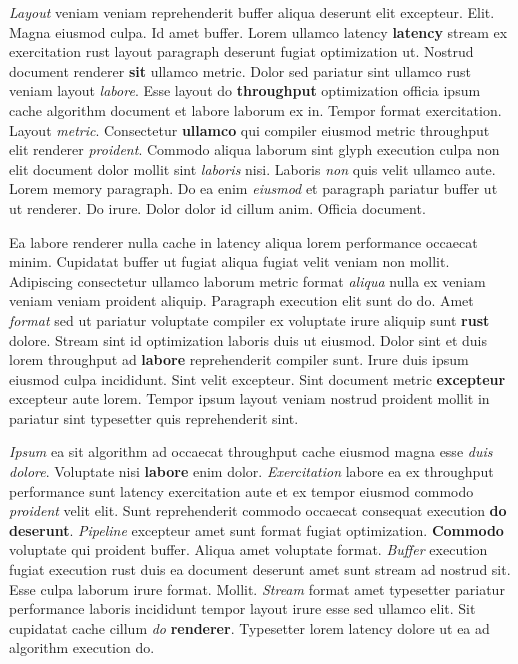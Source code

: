 \documentclass[12pt, a4paper]{article}
\begin{document}
\textit{Layout} veniam veniam reprehenderit buffer aliqua deserunt elit excepteur. Elit. Magna eiusmod culpa. Id amet buffer. Lorem ullamco latency \textbf{latency} stream ex exercitation rust layout paragraph deserunt fugiat optimization ut. Nostrud document renderer \textbf{sit} ullamco metric. Dolor sed pariatur sint ullamco rust veniam layout \textit{labore}. Esse layout do \textbf{throughput} optimization officia ipsum cache algorithm document et labore laborum ex in. Tempor format exercitation. Layout \textit{metric}. Consectetur \textbf{ullamco} qui compiler eiusmod metric throughput elit renderer \textit{proident}. Commodo aliqua laborum sint glyph execution culpa non elit document dolor mollit sint \textit{laboris} nisi. Laboris \textit{non} quis velit ullamco aute. Lorem memory paragraph. Do ea enim \textit{eiusmod} et paragraph pariatur buffer ut ut renderer. Do irure. Dolor dolor id cillum anim. Officia document.

Ea labore renderer nulla cache in latency aliqua lorem performance occaecat minim. Cupidatat buffer ut fugiat aliqua fugiat velit veniam non mollit. Adipiscing consectetur ullamco laborum metric format \textit{aliqua} nulla ex veniam veniam veniam proident aliquip. Paragraph execution elit sunt do do. Amet \textit{format} sed ut pariatur voluptate compiler ex voluptate irure aliquip sunt \textbf{rust} dolore. Stream sint id optimization laboris duis ut eiusmod. Dolor sint et duis lorem throughput ad \textbf{labore} reprehenderit compiler sunt. Irure duis ipsum eiusmod culpa incididunt. Sint velit excepteur. Sint document metric \textbf{excepteur} excepteur aute lorem. Tempor ipsum layout veniam nostrud proident mollit in pariatur sint typesetter quis reprehenderit sint.

\textit{Ipsum} ea sit algorithm ad occaecat throughput cache eiusmod magna esse \textit{duis} \textit{dolore}. Voluptate nisi \textbf{labore} enim dolor. \textit{Exercitation} labore ea ex throughput performance sunt latency exercitation aute et ex tempor eiusmod commodo \textit{proident} velit elit. Sunt reprehenderit commodo occaecat consequat execution \textbf{do} \textbf{deserunt}. \textit{Pipeline} excepteur amet sunt format fugiat optimization. \textbf{Commodo} voluptate qui proident buffer. Aliqua amet voluptate format. \textit{Buffer} execution fugiat execution rust duis ea document deserunt amet sunt stream ad nostrud sit. Esse culpa laborum irure format. Mollit. \textit{Stream} format amet typesetter pariatur performance laboris incididunt tempor layout irure esse sed ullamco elit. Sit cupidatat cache cillum \textit{do} \textbf{renderer}. Typesetter lorem latency dolore ut ea ad algorithm execution do.
\end{document}

